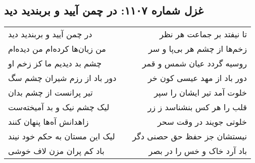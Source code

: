 \begin{center}
\section*{غزل شماره ۱۱۰۷: در چمن آیید و بربندید دید}
\label{sec:1107}
\begin{longtable}{l p{0.5cm} r}
در چمن آیید و بربندید دید
&&
تا نیفتد بر جماعت هر نظر
\\
من زیان‌ها کرده‌ام من دیده‌ام
&&
زخم‌ها از چشم هر بی‌پا و سر
\\
چشم بد دیدیم ما کز زخم او
&&
روسیه گردد عیان شمس و قمر
\\
دور باد از رزم شیران چشم سگ
&&
دور باد از مهد عیسی کون خر
\\
تیر پرانست از چشم بدان
&&
خلوت آمد تیر ایشان را سپر
\\
لیک چشم نیک و بد آمیخته‌ست
&&
قلب را هر کس بنشناسد ز زر
\\
زاهدانش آه‌ها پنهان کنند
&&
خلوتی جویند در وقت سحر
\\
لیک این مستان به حکم خود نیند
&&
نیستشان جز حفظ حق حصنی دگر
\\
باد کم پران مزن لاف خوشی
&&
باد آرد خاک و خس را در بصر
\\
\end{longtable}
\end{center}
